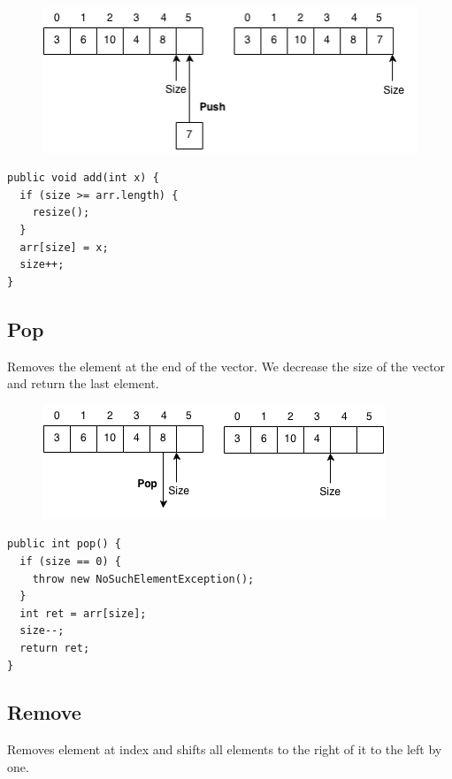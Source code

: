 \documentclass[11pt,oneside]{book}
\makeatletter
\def\maxwidth#1{\ifdim\Gin@nat@width>#1 #1\else\Gin@nat@width\fi}
\makeatother
\begin{document}
\vspace{5px}\begin{figure}[H]\centering
        \includegraphics[width=0.66\maxwidth{\textwidth}]{vector2.png}
        \end{figure}

\begin{lstlisting}
public void add(int x) {
  if (size >= arr.length) {
    resize();
  }
  arr[size] = x;
  size++;
}
\end{lstlisting}

\subsection{Pop}

Removes the element at the end of the vector. We decrease the size of the vector and return the last element.

\vspace{5px}\begin{figure}[H]\centering
        \includegraphics[width=0.66\maxwidth{\textwidth}]{vector4.png}
        \end{figure}

\begin{lstlisting}
public int pop() {
  if (size == 0) {
    throw new NoSuchElementException();
  }
  int ret = arr[size];
  size--;
  return ret;
}
\end{lstlisting}

\subsection{Remove}

Removes element at index and shifts all elements to the right of it to the left by one.
\end{document}
